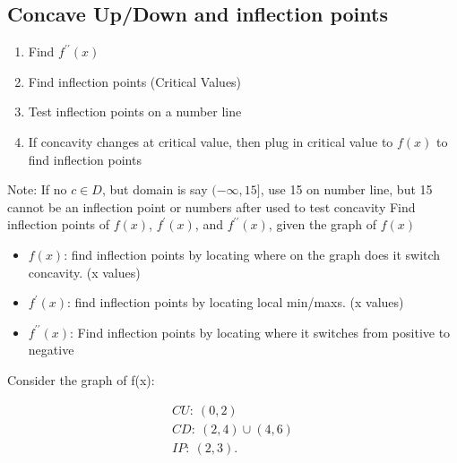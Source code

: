 \documentclass{report}
\begin{document}
    \bigbreak \noindent \bigbreak \noindent 
    \subsection{Concave Up/Down and inflection points}
    \begin{enumerate}
      \item Find $f^{\prime\prime}(x)$
      \item Find inflection points (Critical Values)
      \item Test inflection points on a number line
      \item If concavity changes at critical value, then plug in critical value to $f(x)$ to find inflection points
    \end{enumerate}
    \bigbreak \noindent 
    Note: If no $c \in D$, but domain is say $(-\infty, 15]$, use 15 on number line, but 15 cannot be an inflection point or numbers after used to test concavity
    \bigbreak \noindent 
    Find inflection points of $f(x)$, $f^{\prime}(x)$, and $f^{\prime\prime}(x)$, given the graph of $f(x)$
    \begin{itemize}
      \item $f(x)$: find inflection points by locating where on the graph does it switch concavity. (x values)
      \item $f^{\prime}(x)$: find inflection points by locating local min/maxs. (x values)
      \item $f^{\prime\prime}(x)$: Find inflection points by locating where it switches from positive to negative
    \end{itemize}
    \bigbreak \noindent 
    Consider the graph of f(x):
    \begin{figure}[ht]
        \centering
        \label{fig:cosdire}
    \end{figure}
    \bigbreak \noindent 
    \begin{align*}
      CU:\ (0,2) \\
      CD:\ (2,4)\cup (4,6) \\
      IP:\ (2,3)
    .\end{align*}
    \bigbreak \noindent \bigbreak \noindent
    \bigbreak \noindent \bigbreak \noindent 

    \pagebreak \bigbreak \noindent
\end{document}
